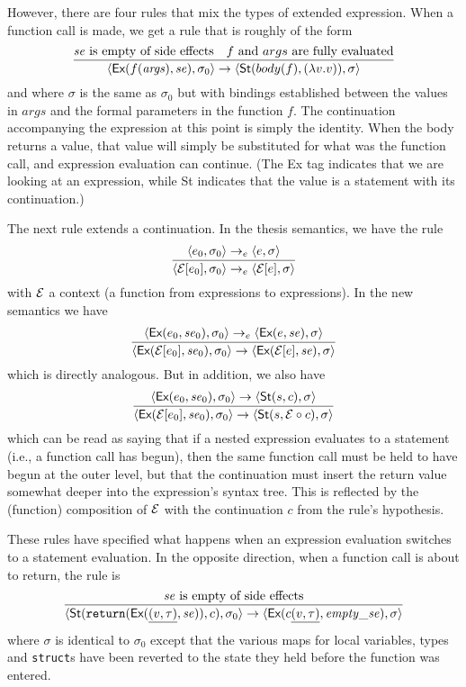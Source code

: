 \documentclass[11pt]{article}
\begin{document}
However, there are four rules that mix the types of extended
expression.  When a function call is made, we get a rule that is
roughly of the form
\[
\infer{
   \langle \textsf{Ex}(f(\mathit{args}), \mathit{se}), \sigma_0\rangle  \rightarrow
   \langle \textsf{St}(body(f), (\lambda v.v)), \sigma\rangle
}{\mathit{se} \mbox{ is empty of side effects} &
  \mbox{$f$ and $args$ are fully evaluated}}
\]
and where $\sigma$ is the same as $\sigma_0$ but with bindings
established between the values in $\mathit{args}$ and the formal
parameters in the function $f$.  The continuation accompanying the
expression at this point is simply the identity.  When the body
returns a value, that value will simply be substituted for what was
the function call, and expression evaluation can continue.  (The
\textsf{Ex} tag indicates that we are looking at an expression, while
\textsf{St} indicates that the value is a statement with its continuation.)

The next rule extends a continuation.  In the thesis semantics, we
have the rule
\[
\infer{\langle {\cal E}[e_0], \sigma_0\rangle \rightarrow_e
  \langle {\cal E}[e],\sigma\rangle}{
  \langle e_0,\sigma_0\rangle \rightarrow_e \langle e,\sigma\rangle}
\]
with $\cal E$ a context (a function from expressions to expressions).
In the new semantics we have
\[
\infer{\langle \textsf{Ex}({\cal E}[e_0], \mathit{se}_0), \sigma_0\rangle \rightarrow
  \langle \textsf{Ex}({\cal E}[e],\mathit{se}),\sigma\rangle}{
  \langle \textsf{Ex}(e_0,\mathit{se}_0),\sigma_0\rangle \rightarrow_e
  \langle \textsf{Ex}(e,\mathit{se}),\sigma\rangle}
\]
which is directly analogous.  But in addition, we also have
\[
\infer{\langle \textsf{Ex}({\cal E}[e_0],\mathit{se}_0),
  \sigma_0\rangle \rightarrow
  \langle \textsf{St}(s, {\cal E} \circ c), \sigma\rangle}{
  \langle \textsf{Ex}(e_0, \mathit{se}_0),\sigma_0\rangle
  \rightarrow
  \langle \textsf{St}(s, c), \sigma\rangle}
\]
which can be read as saying that if a nested expression evaluates to a
statement (i.e., a function call has begun), then the same function
call must be held to have begun at the outer level, but that the
continuation must insert the return value somewhat deeper into the
expression's syntax tree.  This is reflected by the (function)
composition of $\cal E$ with the continuation $c$ from the rule's
hypothesis.

These rules have specified what happens when an expression evaluation
switches to a statement evaluation.  In the opposite direction, when a
function call is about to return, the rule is
\[
\infer{%
  \langle\textsf{St}(\texttt{return}
  (\textsf{Ex}(\underline{(v,\tau)}, \mathit{se})), c), \sigma_0\rangle
  \rightarrow
  \langle \textsf{Ex}(c\underline{(v,\tau)}, \mathit{empty\_se}),
  \sigma\rangle}{
  \mbox{$\mathit{se}$ is empty of side effects}}
\]
where $\sigma$ is identical to $\sigma_0$ except that the various maps
for local variables, types and \texttt{struct}s have been reverted to
the state they held before the function was entered.
\end{document}
